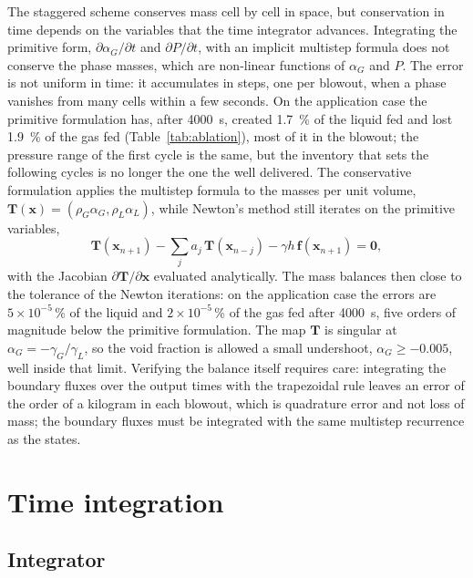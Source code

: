 \documentclass[a4paper,fleqn]{cas-sc}
\newcommand{\aG}{\alpha_G}
\newcommand{\aL}{\alpha_L}
\newcommand{\bx}{\mathbf{x}}
\newcommand{\bF}{\mathbf{f}}
\newcommand{\bT}{\mathbf{T}}
\begin{document}
The staggered scheme conserves mass cell by cell in space, but conservation in time depends on the variables that the time integrator advances. Integrating the primitive form, $\partial\aG/\partial t$ and $\partial P/\partial t$, with an implicit multistep formula does not conserve the phase masses, which are non-linear functions of $\aG$ and $P$. The error is not uniform in time: it accumulates in steps, one per blowout, when a phase vanishes from many cells within a few seconds. On the application case the primitive formulation has, after \SI{4000}{\second}, created \SI{1.7}{\percent} of the liquid fed and lost \SI{1.9}{\percent} of the gas fed (Table~\ref{tab:ablation}), most of it in the blowout; the pressure range of the first cycle is the same, but the inventory that sets the following cycles is no longer the one the well delivered. The conservative formulation applies the multistep formula to the masses per unit volume, $\bT(\bx) = (\rho_G\aG, \rho_L\aL)$, while Newton's method still iterates on the primitive variables,
\begin{equation}\label{eq:conservative}
\bT(\bx_{n+1}) - \sum_{j} a_j\, \bT(\bx_{n-j}) - \gamma h\, \bF(\bx_{n+1}) = \mathbf{0},
\end{equation}
with the Jacobian $\partial\bT/\partial\bx$ evaluated analytically. The mass balances then close to the tolerance of the Newton iterations: on the application case the errors are $5\times10^{-5}$\,\% of the liquid and $2\times10^{-5}$\,\% of the gas fed after \SI{4000}{\second}, five orders of magnitude below the primitive formulation. The map $\bT$ is singular at $\aG = -\gamma_G/\gamma_L$, so the void fraction is allowed a small undershoot, $\aG \geq -0.005$, well inside that limit. Verifying the balance itself requires care: integrating the boundary fluxes over the output times with the trapezoidal rule leaves an error of the order of a kilogram in each blowout, which is quadrature error and not loss of mass; the boundary fluxes must be integrated with the same multistep recurrence as the states.

\section{Time integration}\label{sec:time}

\subsection{Integrator}\label{sec:bdf}
\end{document}

